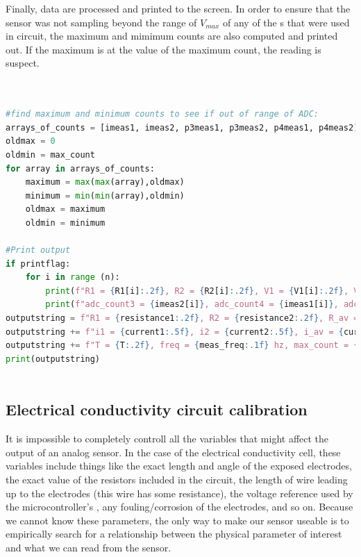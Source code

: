 Finally, data are processed and printed to the screen. In order to ensure that the sensor was not sampling beyond the range of $V_{max}$ of any of the \adc s that were used in circuit, the maximum and mimimum \adc counts are also computed and printed out.  If the maximum is at the value of the maximum count, the reading is suspect.

\begin{lstlisting}[language=Python]

    
#find maximum and minimum counts to see if out of range of ADC:
arrays_of_counts = [imeas1, imeas2, p3meas1, p3meas2, p4meas1, p4meas2]
oldmax = 0
oldmin = max_count
for array in arrays_of_counts:
    maximum = max(max(array),oldmax)
    minimum = min(min(array),oldmin)
    oldmax = maximum
    oldmin = minimum

#Print output
if printflag:
    for i in range (n):
        print(f"R1 = {R1[i]:.2f}, R2 = {R2[i]:.2f}, V1 = {V1[i]:.2f}, V2 = {V2[i]:.2f}, i1 = {i1[i]:.2f}, i2 = {i2[i]:.2f}")
        print(f"adc_count3 = {imeas2[i]}, adc_count4 = {imeas1[i]}, adc1_1 = {p3meas1[i]}, acd1_2 = {p4meas1[i]}, adc2_1 = {p4meas1[i]}, adc2_2 = {p4meas2[i]}")
outputstring = f"R1 = {resistance1:.2f}, R2 = {resistance2:.2f}, R_av = {resistance_average:.2f}, "
outputstring += f"i1 = {current1:.5f}, i2 = {current2:.5f}, i_av = {current_average:.5f}, "
outputstring += f"T = {T:.2f}, freq = {meas_freq:.1f} hz, max_count = {maximum}, min_count = {minimum}"
print(outputstring)
    
\end{lstlisting}


\subsection{Electrical conductivity circuit calibration}

It is impossible to completely controll all the variables that might affect the output of an analog sensor. In the case of the electrical conductivity cell, these variables include things like the exact length and angle of the exposed electrodes, the exact value of the resistors included in the circuit, the length of wire leading up to the electrodes (this wire has some resistance), the voltage reference used by the microcontroller's \adc, any fouling/corrosion of the electrodes, and so on.  Because we cannot know these parameters, the only way to make our sensor useable is to empirically search for a relationship between the physical parameter of interest and what we can read from the sensor.

